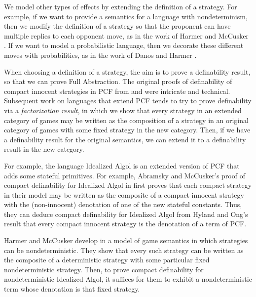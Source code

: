 We model other types of effects by extending the definition of a strategy.  
For example, if we want to provide a semantics for a language with nondeterminism, then we modify the definition of a strategy so that the proponent can have multiple replies to each opponent move, as in the work of Harmer and McCusker \cite{mcCHFiniteND}.
If we want to model a probabilistic language, then we decorate these different moves with probabilities, as in the work of Danos and Harmer \cite{DanosHarmer}.

When choosing a definition of a strategy, the aim is to prove a definability result, so that we can prove Full Abstraction.  
The original proofs of definability of compact innocent strategies in PCF from \cite{ajmPcf} and \cite{hoPcf} were intricate and technical.  
Subsequent work on languages that extend PCF tends to try to prove definability via a \emph{factorization result}, in which we show that every strategy in an extended category of games may be written as the composition of a strategy in an original category of games with some fixed strategy in the new category.  
Then, if we have a definability result for the original semantics, we can extend it to a definability result in the new category.

For example, the language Idealized Algol is an extended version of PCF that adds some stateful primitives.
For example, Abramsky and McCusker's proof of compact definability for Idealized Algol in \cite{SamsonGuyIAActive} first proves that each compact strategy in their model may be written as the composite of a compact innocent strategy with the (non-innocent) denotation of one of the new stateful constants.  
Thus, they can deduce compact definability for Idealized Algol from Hyland and Ong's result that every compact innocent strategy is the denotation of a term of PCF.  

Harmer and McCusker develop in \cite{mcCHFiniteND} a model of game semantics in which strategies can be nondeterministic.  
They show that every such strategy can be written as the composite of a deterministic strategy with some particular fixed nondeterministic strategy.  
Then, to prove compact definability for nondeterministic Idealized Algol, it suffices for them to exhibit a nondeterministic term whose denotation is that fixed strategy.

